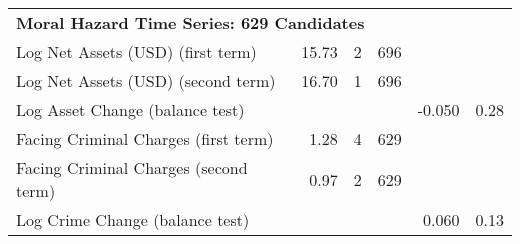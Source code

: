 \begin{tabular}{l r r r r r}
\multicolumn{6}{l}{\textbf{Moral Hazard Time Series: 629 Candidates}} \\
\quad Log Net Assets (USD) (first term)     & 15.73 & 2 & 696 & & \\
\quad Log Net Assets (USD) (second term)    & 16.70 & 1 & 696 & & \\
\quad Log Asset Change (balance test)        &                &                    &             & -0.050 & 0.28    \\
\quad Facing Criminal Charges (first term)  & 1.28  & 4  & 629  & & \\
\quad Facing Criminal Charges (second term) & 0.97  & 2  & 629  & & \\
\quad Log Crime Change (balance test)        &                &                    &             & 0.060 & 0.13    \\
\hline\end{tabular}

